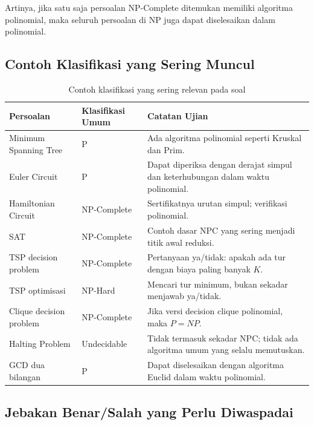 Artinya, jika satu saja persoalan NP-Complete ditemukan memiliki algoritma polinomial, maka seluruh persoalan di NP juga dapat diselesaikan dalam polinomial.

\subsection{Contoh Klasifikasi yang Sering Muncul}

\begin{table}[H]
\centering
\small
\begin{tabularx}{\textwidth}{|L{0.28\textwidth}|L{0.18\textwidth}|X|}
\hline
\textbf{Persoalan} & \textbf{Klasifikasi Umum} & \textbf{Catatan Ujian} \\
\hline
Minimum Spanning Tree & P & Ada algoritma polinomial seperti Kruskal dan Prim. \\
\hline
Euler Circuit & P & Dapat diperiksa dengan derajat simpul dan keterhubungan dalam waktu polinomial. \\
\hline
Hamiltonian Circuit & NP-Complete & Sertifikatnya urutan simpul; verifikasi polinomial. \\
\hline
SAT & NP-Complete & Contoh dasar NPC yang sering menjadi titik awal reduksi. \\
\hline
TSP decision problem & NP-Complete & Pertanyaan ya/tidak: apakah ada tur dengan biaya paling banyak $K$. \\
\hline
TSP optimisasi & NP-Hard & Mencari tur minimum, bukan sekadar menjawab ya/tidak. \\
\hline
Clique decision problem & NP-Complete & Jika versi decision clique polinomial, maka $P=NP$. \\
\hline
Halting Problem & Undecidable & Tidak termasuk sekadar NPC; tidak ada algoritma umum yang selalu memutuskan. \\
\hline
GCD dua bilangan & P & Dapat diselesaikan dengan algoritma Euclid dalam waktu polinomial. \\
\hline
\end{tabularx}
\caption{Contoh klasifikasi yang sering relevan pada soal}
\label{tab:contoh-klasifikasi-p-np-npc}
\end{table}

\subsection{Jebakan Benar/Salah yang Perlu Diwaspadai}

